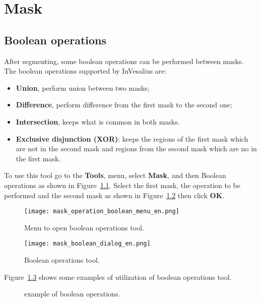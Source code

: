 \chapter{Mask}


\section{Boolean operations}

After segmenting, some boolean operations can be performed between masks. The boolean operations supported by InVesalius are:

\begin{itemize}
	\item \textbf{Union}, perform union between two masks;
	\item \textbf{Difference}, perform difference from the first mask to the second one;
	\item \textbf{Intersection}, keeps what is common in both masks.
	\item \textbf{Exclusive disjunction (XOR)}: keeps the regions of the first mask which are not in the second mask and regions from the second mask which are no in the first mask.
\end{itemize}

To use this tool go to the \textbf{Tools}, menu, select \textbf{Mask}, and then Boolean operations as shown in Figure~\ref{fig:booleano_menu}. Select the first mask, the operation to be performed and the second mask as shown in Figure~\ref{fig:booleano_janela} then click \textbf{OK}.


\begin{figure}[!htb]
\centering
\texttt{[image: mask\_operation\_boolean\_menu\_en.png]}
\caption{Menu to open boolean operations tool.}
\label{fig:booleano_menu}
\end{figure}


\begin{figure}[!htb]
\centering
\texttt{[image: mask\_boolean\_dialog\_en.png]}
\caption{Boolean operations tool.}
\label{fig:booleano_janela}
\end{figure}

Figure~\ref{fig:op_boolana} shows some examples of utilization of boolean operations tool.

\begin{figure}[!htb]
  \centering
  \hfill
  \hfill
  \hfill
  \hfill
  \hfill
  \caption{example of boolean operations.}
  \label{fig:op_boolana}
\end{figure}

